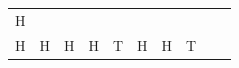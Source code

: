 {\begin{tabular}[t]{|l|l|l|l|l|l|l|l|l|l|}
        H%
     \tabularnewline\cline{1-1}\cline{2-2}\cline{3-3}\cline{4-4}\cline{5-5}\cline{6-6}\cline{7-7}\cline{8-8}\cline{9-9}\cline{10-10}
    
    
        H &
    
    
        H &
    
    
        H &
    
    
        H &
    
    
        T &
    
    
        H &
    
    
        H &
    
    
        T &
    

\end{tabular}}
